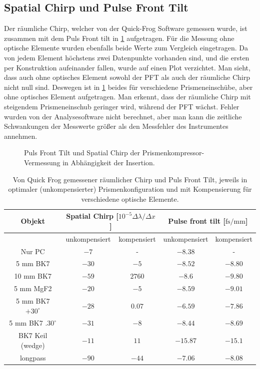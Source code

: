 \documentclass[twoside,        %
               BCOR12mm,       %
               english,ngerman, %
               fleqn,headsepline=false,footsepline=false
              ]{Vorlage/MFPREPORT}
\begin{document}
\subsection{Spatial Chirp und Pulse Front Tilt}
Der räumliche Chirp, welcher von der Quick-Frog Software gemessen wurde, ist
zusammen mit dem Puls Front tilt in \cref{tab:pft} aufgetragen. Für die Messung
ohne optische Elemente wurden ebenfalls beide Werte zum Vergleich eingetragen. 
Da von jedem Element höchstens zwei Datenpunkte vorhanden sind, und die ersten
per Konstruktion aufeinander fallen, wurde auf einen
Plot verzichtet. Man sieht, dass auch ohne optisches Element sowohl der PFT als
auch der räumliche Chirp nicht null sind. Deswegen ist in \cref{fig:pcpft}
beides für verschiedene Prismeneinschübe, aber ohne optisches Element
aufgetragen. Man erkennt, dass der räumliche Chirp mit steigendem
Prismeneinschub geringer wird, während der PFT wächst. Fehler wurden von der Analysesoftware nicht berechnet, aber man
kann die zeitliche Schwankungen der Messwerte größer als den Messfehler des Instrumentes
annehmen.
\begin{figure}[]
    \begin{center}
        
    \end{center}
    \caption{Puls Front Tilt und Spatial Chirp der Prismenkompressor-Vermessung
    in Abhängigkeit der Insertion.}
    \label{fig:pcpft}
\end{figure}

\begin{table}
    \centering
    \begin{tabular}[]{|c||c|c||c|c|}
        \hline
        Objekt&\multicolumn{2}{|c||}{Spatial Chirp [$10^{-5}\Delta\lambda/\Delta x$]}&\multicolumn{2}{|c|}{Pulse front tilt [$\text{fs}/\text{mm}$]}\\\hline
         &unkompensiert&kompensiert&unkompensiert&kompensiert\\ 
        \hline
        Nur PC&$-7$&-&$-8.38$&-\\\hline
        5 mm BK7&$-30$&$-5$&$-8.52$&$-8.80$\\\hline
        10 mm BK7&$-59$&$2760$&$-8.6$&$-9.80$\\\hline
        5 mm MgF2&$-20$&$-5$&$-8.59$&$-9.01$\\\hline
        5 mm BK7 $+30^\circ$&$-28$&$0.07$&$-6.59$&$-7.86$\\\hline
        5 mm BK7 $.30^\circ$&$-31$&$-8$&$-8.44$&$-8.69$\\\hline
        BK7 Keil (wedge)&$-11$&$11$&$-15.87$&$-15.1$\\\hline
        longpass&$-90$&$-44$&$-7.06$&$-8.08$\\\hline
    \end{tabular}
    \caption{Von Quick Frog gemessener räumlicher Chirp und Puls Front Tilt,
    jeweils in optimaler (unkompensierter) Prismenkonfiguration und mit
    Kompensierung für verschiedene optische Elemente.}
    \label{tab:pft}
\end{table}
\end{document}
